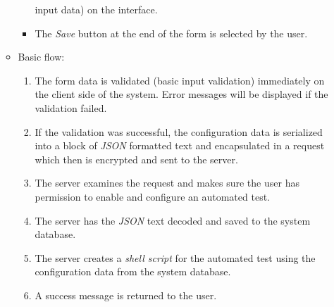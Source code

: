 \begin{enumerate}
\begin{itemize}
\begin{itemize}
                input data) on the
                interface.
            \item The \emph{Save} button at the end of the form is selected by
                the user.
        \end{itemize}
    \item Basic flow:
        \begin{enumerate}
            \item The form data is validated (basic input validation)
                immediately on the client side of the system. Error messages
                will be displayed if the validation failed.
            \item If the validation was successful, the configuration data is
                serialized into a block of \emph{JSON} \cite{JSON} formatted text and
                encapsulated in a request which then is encrypted and sent to
                the server.
            \item The server examines the request and makes sure the user has
                permission to enable and configure an automated test.
            \item The server has the \emph{JSON} text decoded and saved to the
                system database.
            \item The server creates a \emph{shell script} \cite{shellScript}
                for the automated test using the configuration data from the
                system database.
            \item A success message is returned to the user.
        \end{enumerate}
\end{itemize}


\end{enumerate}
